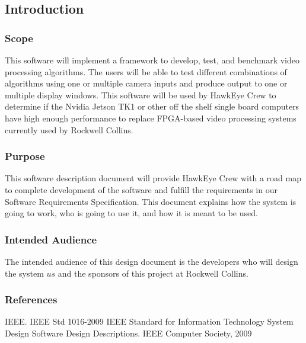 \subsection{Introduction}
\subsubsection{Scope}
This software will implement a framework to develop, test, and benchmark video processing
algorithms. The users will be able to test different combinations of algorithms using one or multiple
camera inputs and produce output to one or multiple display windows. This software will be used by
HawkEye Crew to determine if the Nvidia Jetson TK1 or other off the shelf single board computers have
high enough performance to replace FPGA-based video processing systems currently used by Rockwell
Collins.\\
\subsubsection{Purpose}
This software description document will provide HawkEye Crew with a road map to complete
development of the software and fulfill the requirements in our Software Requirements Specification.
This document explains how the system is going to work, who is going to use it, and how it is meant to
be used.\\
\subsubsection{Intended Audience}
The intended audience of this design document is the developers who will design the system \(us\)
and the sponsors of this project at Rockwell Collins.\\
\subsubsection{References}
IEEE. IEEE Std 1016-2009 IEEE Standard for Information Technology \- System Design \- Software
Design Descriptions. IEEE Computer Society, 2009

